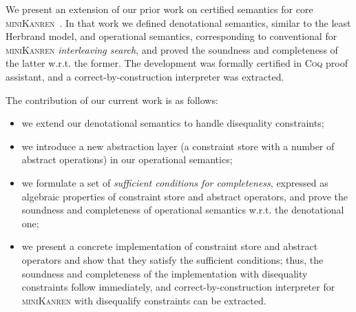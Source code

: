 \documentclass[submission,copyright,creativecommons]{eptcs}
\newcommand{\reprfun}{\mathfrak{f}}
\begin{document}

We present an extension of our prior work on certified semantics for core \textsc{miniKanren}~\cite{CertifiedSemantics}. In that work we
defined denotational semantics, similar to the least Herbrand model, and operational semantics, corresponding to conventional for \textsc{miniKanren}
\emph{interleaving search}, and proved the soundness and completeness of the latter w.r.t. the former. The development was formally certified in
\textsc{Coq} proof assistant, and a correct-by-construction interpreter was extracted.

The contribution of our current work is as follows:

\begin{itemize}
\item we extend our denotational semantics to handle disequality constraints;
\item we introduce a new abstraction layer (a constraint store with a number of abstract operations) in our operational semantics;
\item we formulate a set of \emph{sufficient conditions for completeness}, expressed as algebraic properties of constraint store and
  abstract operators, and prove the soundness and completeness of operational semantics w.r.t. the denotational one;
\item we present a concrete implementation of constraint store and abstract operators and show that they satisfy the
  sufficient conditions; thus, the soundness and completeness of the implementation with disequality constraints follow
  immediately, and correct-by-construction interpreter for \textsc{miniKanren} with disequalify constraints
  can be extracted.
\end{itemize}

\end{document}
